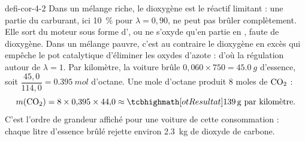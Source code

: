 \begin{blocEdition}{defi-cor-4-2}
\label{figedition-defi-cor-4-2-1}
Dans un mélange riche, le dioxygène est le réactif limitant : une partie du carburant, ici \qty{10}{\percent} pour $\lambda=0{,}90$, ne
peut pas brûler complètement. Elle sort du moteur sous forme d', ou ne s'oxyde qu'en partie en
, faute de dioxygène. Dans un mélange pauvre, c'est au contraire le dioxygène en excès qui
empêche le pot catalytique d'éliminer les oxydes d'azote : d'où la régulation autour de $\lambda=1$.
Par kilomètre, la voiture brûle $0{,}060\times750=\qty{45,0}{g}$ d'essence, soit $\dfrac{45{,}0}{114{,}0}=\qty{0,395}{mol}$ d'octane. Une mole d'octane
produit 8 moles de $\ce{CO2}$ :
\[m(\ce{CO2})=8\times0{,}395\times44{,}0\approx\res{\qty{139}{g}}\text{ par kilomètre}.\]
C'est l'ordre de grandeur affiché pour une voiture de cette consommation : chaque litre d'essence brûlé rejette environ
\qty{2,3}{kg} de dioxyde de carbone.
\end{blocEdition}

